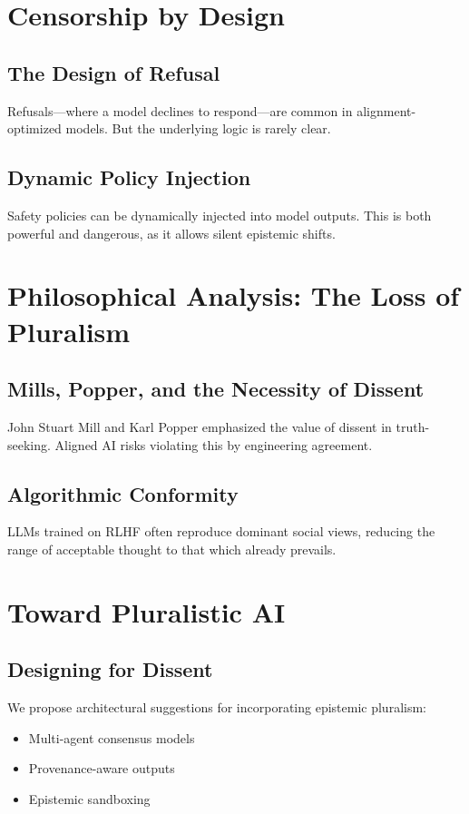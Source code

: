 \documentclass{article}
\begin{document}
\section{Censorship by Design}
\subsection{The Design of Refusal}
Refusals---where a model declines to respond---are common in alignment-optimized models. But the underlying logic is rarely clear.

\subsection{Dynamic Policy Injection}
Safety policies can be dynamically injected into model outputs. This is both powerful and dangerous, as it allows silent epistemic shifts.

\section{Philosophical Analysis: The Loss of Pluralism}
\subsection{Mills, Popper, and the Necessity of Dissent}
John Stuart Mill and Karl Popper emphasized the value of dissent in truth-seeking. Aligned AI risks violating this by engineering agreement.

\subsection{Algorithmic Conformity}
LLMs trained on RLHF often reproduce dominant social views, reducing the range of acceptable thought to that which already prevails.

\section{Toward Pluralistic AI}
\subsection{Designing for Dissent}
We propose architectural suggestions for incorporating epistemic pluralism:
\begin{itemize}
    \item Multi-agent consensus models
    \item Provenance-aware outputs
    \item Epistemic sandboxing
\end{itemize}
\end{document}
